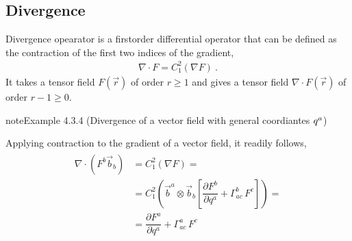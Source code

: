 \documentclass[letterpaper,10pt,english]{jupyterBook}
\begin{document}
\subsection{Divergence}
\label{\detokenize{ch/tensor-algebra-calculus/calculus-euclidean:divergence}}\label{\detokenize{ch/tensor-algebra-calculus/calculus-euclidean:tensor-calculus-differential-operators-divergence}}
\sphinxAtStartPar
Divergence opearator is a first\sphinxhyphen{}order differential operator that can be defined as the contraction of the first two indices of the gradient,
\begin{equation*}
\begin{split}\nabla \cdot F = C_{1}^{2}\left( \nabla F \right) \ .\end{split}
\end{equation*}
\sphinxAtStartPar
It takes a tensor field \(F(\vec{r})\) of order \(r \ge 1\) and gives a tensor field \(\nabla \cdot F(\vec{r})\) of order \(r-1 \ge 0\).
\label{ch/tensor-algebra-calculus/calculus-euclidean:example-7}
\begin{sphinxadmonition}{note}{Example 4.3.4 (Divergence of a vector field \sphinxhyphen{} with general coordiantes \protect\(q^{a}\protect\))}



\sphinxAtStartPar
Applying contraction to the gradient of a vector field, it readily follows,
\begin{equation*}
\begin{split}\begin{aligned}
  \nabla \cdot \left( F^b \vec{b}_b \right)
  & = C_{1}^{2} \left( \nabla F \right) = \\
  & = C_1^2 \left( \vec{b}^a \otimes \vec{b}_b \left[ \dfrac{\partial F^b}{\partial q^a} + \Gamma_{ac}^b \, F^c \right] \right) = \\
  & = \dfrac{\partial F^a}{\partial q^a} + \Gamma_{ac}^a \, F^c
\end{aligned}\end{split}
\end{equation*}\end{sphinxadmonition}
\label{ch/tensor-algebra-calculus/calculus-euclidean:example-8}
\end{document}
